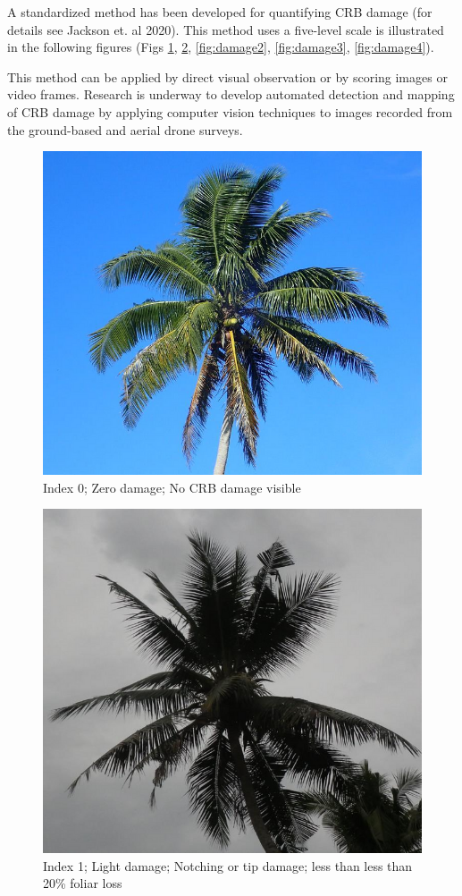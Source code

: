\documentclass[twocolumn,letterpaper]{scrartcl}
\begin{document}
A standardized method has been developed for quantifying CRB damage (for details see Jackson et. al 2020). This method uses a five-level scale is illustrated in the following figures (Figs \ref{fig:damage0}, \ref{fig:damage1}, \ref{fig:damage2}, \ref{fig:damage3}, \ref{fig:damage4}). 

This method can be applied by direct visual observation or by scoring images or video frames. Research is underway to develop automated detection and mapping of CRB damage by applying computer vision techniques to images recorded from the ground-based and aerial drone surveys. 

\begin{figure}[h!]
	\centering
	\includegraphics[width=.8\linewidth]{images/j5index0.resized.png}
	\caption{Index 0; Zero damage; No CRB damage visible}
	\label{fig:damage0}
\end{figure}

\begin{figure}[h!]
	\centering
	\includegraphics[width=.8\linewidth]{images/j5index1.resized.png}
	\caption{Index 1; Light damage; Notching or tip damage; less than less than 20\% foliar loss}
	\label{fig:damage1}
\end{figure}
\end{document}
